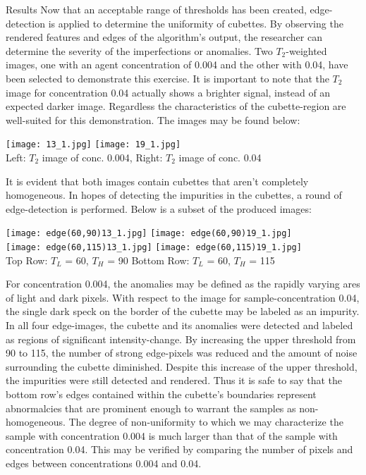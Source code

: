 \documentclass[a4paper,12pt]{article}
\begin{document}
\begin{section}{Results}
Now that an acceptable range of thresholds has been created, edge-detection is applied to determine the uniformity of cubettes. By observing the rendered features and edges of the algorithm's output, the researcher can determine the severity of the imperfections or anomalies. Two $T_2$-weighted images, one with an agent concentration of 0.004 and the other with 0.04, have been selected to demonstrate this exercise. It is important to note that the $T_2$ image for concentration 0.04 actually shows a brighter signal, instead of an expected darker image. Regardless the characteristics of the cubette-region are well-suited for this demonstration. The images may be found below:

\begin{center}
\texttt{[image: 13\_1.jpg]}
\texttt{[image: 19\_1.jpg]}\\
\small{Left: $T_2$ image of conc. 0.004, Right: $T_2$ image of conc. 0.04}
\end{center}

It is evident that both images contain cubettes that aren't completely homogeneous. In hopes of detecting the impurities in the cubettes, a round of edge-detection is performed. Below is a subset of the produced images:

\begin{center}
\texttt{[image: edge(60,90)13\_1.jpg]}
\texttt{[image: edge(60,90)19\_1.jpg]}\\
\texttt{[image: edge(60,115)13\_1.jpg]}
\texttt{[image: edge(60,115)19\_1.jpg]}\\
\small{Top Row: $T_L$ = 60, $T_H$ = 90} \hspace{1mm} \small{Bottom Row: $T_L$ = 60, $T_H$ = 115}
\end{center}

For concentration 0.004, the anomalies may be defined as the rapidly varying ares of light and dark pixels. With respect to the image for sample-concentration 0.04, the single dark speck on the border of the cubette may be labeled as an impurity. In all four edge-images, the cubette and its anomalies were detected and labeled as regions of significant intensity-change. By increasing the upper threshold from 90 to 115, the number of strong edge-pixels was reduced and the amount of noise surrounding the cubette diminished. Despite this increase of the upper threshold, the impurities were still detected and rendered. Thus it is safe to say that the bottom row's edges contained within the cubette's boundaries represent abnormalcies that are prominent enough to warrant the samples as non-homogeneous. The degree of non-uniformity to which we may characterize the sample with concentration 0.004 is much larger than that of the sample with concentration 0.04. This may be verified by comparing the number of pixels and edges between concentrations 0.004 and 0.04.


\end{section}
\end{document}
